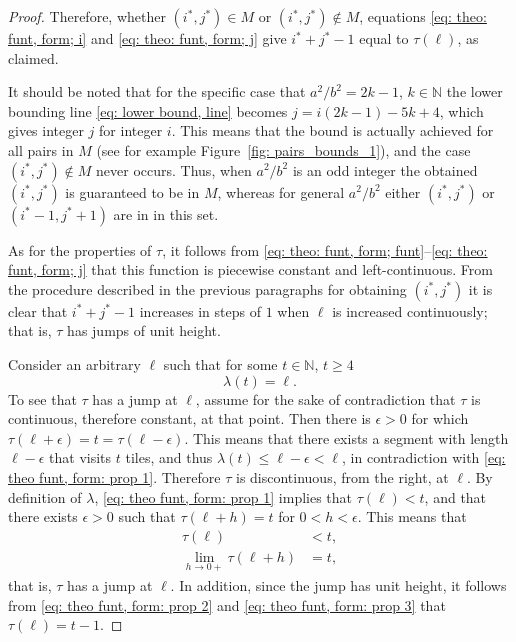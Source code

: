 \documentclass[12pt, a4paper]{article}
\newcommand{\funt}{\tau} %
\newcommand{\funl}{\lambda} %
\newcommand{\len}{\ell} %
\newcommand{\tiles}{t} %
\newcommand{\isoli}{i^\ast}
\newcommand{\jsoli}{j^\ast}
\newcommand{\mss}{M}
\begin{document}
\begin{proof}
Therefore, whether $(\isoli,\jsoli) \in \mss$ or $(\isoli,\jsoli) \notin \mss$, equations \eqref{eq: theo: funt, form; i} and \eqref{eq: theo: funt, form; j} give $\isoli+\jsoli-1$ equal to $\funt(\len)$, as claimed.

It should be noted that for the specific case that $a^2/b^2 = 2k-1$, $k \in \mathbb N$ the lower bounding line \eqref{eq: lower bound, line} becomes $j = i(2k-1)-5k+4$, which gives integer $j$ for integer $i$. This means that the bound is actually achieved for all pairs in $\mss$ (see for example Figure~\ref{fig: pairs_bounds_1}), and the case $(\isoli,\jsoli) \notin \mss$ never occurs. Thus, when $a^2/b^2$ is an odd integer the obtained $(\isoli,\jsoli)$ is guaranteed to be in $\mss$, whereas for general $a^2/b^2$ either $(\isoli,\jsoli)$ or $(\isoli-1,\jsoli+1)$ are in in this set.

As for the properties of $\funt$, it follows from \eqref{eq: theo: funt, form; funt}--\eqref{eq: theo: funt, form; j} that this function is piecewise constant and left-continuous. From the procedure described in the previous paragraphs for obtaining $(\isoli, \jsoli)$ it is clear that $\isoli+\jsoli-1$ increases in steps of $1$ when $\len$ is increased continuously; that is, $\funt$ has jumps of unit height.

Consider an arbitrary $\len$ such that for some $\tiles \in \mathbb N$, $\tiles \geq 4$
\begin{equation}
\label{eq: theo funt, form: prop 1}
\funl(\tiles)=\len.
\end{equation}
To see that $\funt$ has a jump at $\len$, assume for the sake of contradiction that $\funt$ is continuous, therefore constant, at that point. Then there is $\epsilon > 0$ for which $\funt(\len+\epsilon) = \tiles = \funt(\len-\epsilon)$. This means that there exists a segment with length $\len-\epsilon$ that visits $\tiles$ tiles, and thus $\funl(\tiles) \leq \len-\epsilon < \len$, in contradiction with \eqref{eq: theo funt, form: prop 1}. Therefore $\funt$ is discontinuous, from the right, at $\len$. By definition of $\funl$, \eqref{eq: theo funt, form: prop 1} implies that $\funt(\len) < \tiles$, and that there exists $\epsilon > 0$ such that $\funt(\len+h) = \tiles$ for $0 < h < \epsilon$. This means that
\begin{align}
\label{eq: theo funt, form: prop 2}
\funt(\len) &< \tiles, \\
\label{eq: theo funt, form: prop 3}
\lim_{h \rightarrow 0+} \funt(\len+h) &= \tiles,
\end{align}
that is, $\funt$ has a jump at $\len$. In addition, since the jump has unit height, it follows from \eqref{eq: theo funt, form: prop 2} and \eqref{eq: theo funt, form: prop 3}  that $\funt(\len) = \tiles-1$.


\end{proof}
\end{document}
